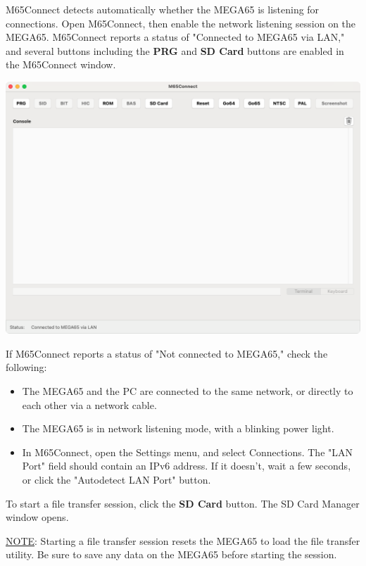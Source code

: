 M65Connect detects automatically whether the MEGA65 is listening for connections. Open M65Connect, then enable the network listening session on the MEGA65. M65Connect reports a status of "Connected to MEGA65 via LAN," and several buttons including the {\bf PRG} and {\bf SD Card} buttons are enabled in the M65Connect window.

\begin{center}
\includegraphics[width=\linewidth]{images/m65connect_macos.png}
\end{center}

If M65Connect reports a status of "Not connected to MEGA65," check the following:

\begin{itemize}
\item The MEGA65 and the PC are connected to the same network, or directly to each other via a network cable.
\item The MEGA65 is in network listening mode, with a blinking power light.
\item In M65Connect, open the Settings menu, and select Connections. The "LAN Port" field should contain an IPv6 address. If it doesn't, wait a few seconds, or click the "Autodetect LAN Port" button.
\end{itemize}

To start a file transfer session, click the {\bf SD Card} button. The SD Card Manager window opens.

\underline{NOTE}: Starting a file transfer session resets the MEGA65 to load the file transfer utility. Be sure to save any data on the MEGA65 before starting the session.

